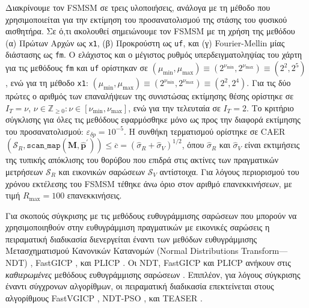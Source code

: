 Διακρίνουμε τον FSMSM σε τρεις υλοποιήσεις, ανάλογα με τη μέθοδο που
χρησιμοποιείται για την εκτίμηση του προσανατολισμού της στάσης του φυσικού
αισθητήρα. Σε ό,τι ακολουθεί σημειώνουμε τον FSMSM με τη χρήση της μεθόδου (α)
Πρώτων Αρχών ως \texttt{x1}, (β) Προκρούστη ως \texttt{uf}, και (γ)
Fourier-Mellin μίας διάστασης ως \texttt{fm}. Ο ελάχιστος και ο μέγιστος ρυθμός
υπερδειγματοληψίας του χάρτη για τις μεθόδους \texttt{fm} και \texttt{uf}
ορίστηκαν σε $(\mu_{\min},\mu_{\max}) \equiv (2^{\nu_{\min}},2^{\nu_{\max}})
\equiv (2^2,2^5)$, ενώ για τη μέθοδο \texttt{x1}: $(\mu_{\min},\mu_{\max})
\equiv (2^{\nu_{\min}},2^{\nu_{\max}}) \equiv (2^2,2^4)$. Για τις δύο πρώτες ο
αριθμός των επαναλήψεων της συνιστώσας εκτίμησης θέσης ορίστηκε σε $I_T=\nu$,
$\nu \in \mathbb{Z}_{\geq 0}: \nu \in [\nu_{\min}, \nu_{\max}]$, ενώ για την
τελευταία σε $I_T = 2$.  Το κριτήριο σύγκλισης για όλες τις μεθόδους
εφαρμόσθηκε μόνο ως προς την διαφορά εκτίμησης του προσανατολισμού:
$\varepsilon_{\delta p} = 10^{-5}$.  Η συνθήκη τερματισμού ορίστηκε σε
CAER$(\mathcal{S}_R, \texttt{scan\_map}(\bm{M}, \hat{\bm{p}}^\prime)) \leq
\overline{c} = (\hat{\sigma}_R + \hat{\sigma}_V)^{1/2}$, όπου $\hat{\sigma}_R$
και $\hat{\sigma}_V$ είναι εκτιμήσεις της τυπικής απόκλισης του θορύβου που
επιδρά στις ακτίνες των πραγματικών μετρήσεων $\mathcal{S}_R$ και εικονικών
σαρώσεων $\mathcal{S}_V$ αντίστοιχα. Για λόγους περιορισμού του χρόνου
εκτέλεσης του FSMSM τέθηκε άνω όριο στον αριθμό επανεκκινήσεων, με τιμή
$R_{\max} = 100$ επανεκκινήσεις.

Για σκοπούς σύγκρισης με τις μεθόδους ευθυγράμμισης σαρώσεων που μπορούν να
χρησιμοποιηθούν στην ευθυγράμμιση πραγματικών με εικονικές σαρώσεις η
πειραματική διαδικασία διενεργείται έναντι των μεθόδων ευθυγράμμισης
Μετασχηματισμού Κανονικών Κατανομών (Normal Distributions Transform---NDT)
\cite{Bibera,ndt_code}, FastGICP \cite{Segal2009a,fgicp_code}, και PLICP
\cite{Censi2008a,plicp_code}. Οι NDT, FastGICP και PLICP ανήκουν στις
\textit{καθιερωμένες} μεθόδους ευθυγράμμισης σαρώσεων
\cite{Koide2021a,Xu2018b,Sobreira2019b,Pishehvari2019b,Qingshan2019c,Pham2021b}.
Επιπλέον, για λόγους σύγκρισης έναντι σύγχρονων αλγορίθμων, οι πειραματική
διαδικασία επεκτείνεται στους αλγορίθμους FastVGICP
\cite{Koide2021a,fgicp_code}, NDT-PSO \cite{Bouraine2021,ndt_pso_code}, και
TEASER \cite{Yang2021,teaser_code}.

